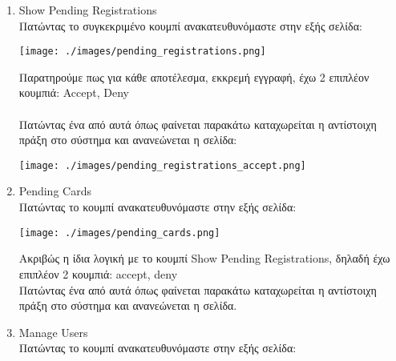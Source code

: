 \documentclass[14pt]{report}
\begin{document}
	
	\begin{enumerate}
		\newpage
		\hypertarget{o-show-pending-reg}{}
		\item Show Pending Registrations \\
		Πατώντας το συγκεκριμένο κουμπί ανακατευθυνόμαστε στην εξής σελίδα: \\
		\vspace{\baselineskip}
		
		\texttt{[image: ./images/pending\_registrations.png]}
		
		\vspace{\baselineskip}
		
		\newpage
		Παρατηρούμε πως για κάθε αποτέλεσμα, εκκρεμή εγγραφή, έχω 2 επιπλέον κουμπιά: Accept, Deny \\ \\
		Πατώντας ένα από αυτά όπως φαίνεται παρακάτω καταχωρείται η αντίστοιχη πράξη στο σύστημα και ανανεώνεται η σελίδα: \\
		
		\vspace{\baselineskip}
		
		\texttt{[image: ./images/pending\_registrations\_accept.png]}
		
		\vspace{\baselineskip}
		
		\newpage
		\hypertarget{o-pending-cards}{}
		\item Pending Cards \\
		Πατώντας το κουμπί ανακατευθυνόμαστε στην εξής σελίδα: \\
		
		
		\vspace{\baselineskip}
		
		\texttt{[image: ./images/pending\_cards.png]}
		
		\vspace{\baselineskip}
		
		Ακριβώς η ίδια λογική με το κουμπί Show Pending Registrations, δηλαδή έχω επιπλέον 2 κουμπιά: accept, deny \\
		Πατώντας ένα από αυτά όπως φαίνεται παρακάτω καταχωρείται η αντίστοιχη πράξη στο σύστημα και ανανεώνεται η σελίδα. \\
		
		\newpage
		\hypertarget{o-manage-users}{}
		\item Manage Users \\
		Πατώντας το κουμπί ανακατευθυνόμαστε στην εξής σελίδα: \\
		

\end{enumerate}
\end{document}
